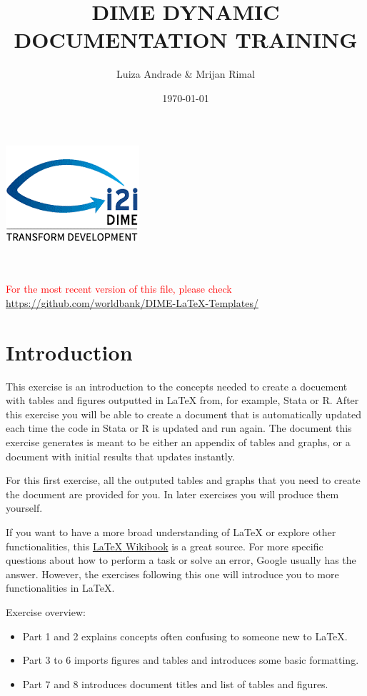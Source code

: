 \documentclass[12pts]{report}
\title{DIME DYNAMIC DOCUMENTATION TRAINING }
\author{Luiza Andrade \& Mrijan Rimal}
\date{\today}
\begin{document}
	

\makeatletter
\begin{titlepage}
	\begin{center}
		\includegraphics[width=0.3\linewidth]{../img/i2i.png}\\[10ex]
		{\LARGE \bfseries  \@title }\\[2ex] 
		{\Large  \@author}\\[20ex] 
		{\large \@date}
	\end{center}
	\vspace{5cm}
	\textcolor{red}{For the most recent version of this file, please check \url{https://github.com/worldbank/DIME-LaTeX-Templates/}}
\end{titlepage}
\makeatother

\section*{Introduction}
This exercise is an introduction to the concepts needed to create a docuement with tables and figures outputted in {\LaTeX} from, for example, Stata or R. After this exercise you will be able to create a document that is automatically updated each time the code in Stata or R is updated and run again. The document this exercise generates is meant to be either an appendix of tables and graphs, or a document with initial results that updates instantly.

For this first exercise, all the outputed tables and graphs that you need to create the document are provided for you. In later exercises you will produce them yourself.

If you want to have a more broad understanding of {\LaTeX} or explore other functionalities, this \href{https://en.wikibooks.org/wiki/LaTeX
}{{\LaTeX} Wikibook} is a great source. For more specific questions about how to perform a task or solve an error, Google usually has the answer. However, the exercises following this one will introduce you to more functionalities in {\LaTeX}.

Exercise overview:
\begin{itemize}
	\item Part 1 and 2 explains concepts often confusing to someone new to {\LaTeX}.
	\item Part 3 to 6 imports figures and tables and introduces some basic formatting.
	\item Part 7 and 8 introduces document titles and list of tables and figures.
\end{itemize}
\end{document}
